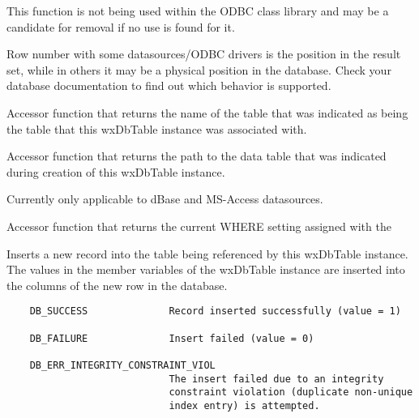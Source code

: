 This function is not being used within the ODBC class library and may be a
candidate for removal if no use is found for it.

Row number with some datasources/ODBC drivers is the position in the result set,
while in others it may be a physical position in the database.  Check your
database documentation to find out which behavior is supported.

\label{wxdbtablegettablename}


Accessor function that returns the name of the table that was indicated
as being the table that this wxDbTable instance was associated with.

\label{wxdbtablegettablepath}


Accessor function that returns the path to the data table that was indicated
during creation of this wxDbTable instance.


Currently only applicable to dBase and MS-Access datasources.

\label{wxdbtablegetwhereclause}


Accessor function that returns the current WHERE setting assigned with the



\label{wxdbtableinsert}


Inserts a new record into the table being referenced by this wxDbTable
instance.  The values in the member variables of the wxDbTable instance are
inserted into the columns of the new row in the database.


\begin{verbatim}
    DB_SUCCESS              Record inserted successfully (value = 1)

    DB_FAILURE              Insert failed (value = 0)

    DB_ERR_INTEGRITY_CONSTRAINT_VIOL
                            The insert failed due to an integrity
                            constraint violation (duplicate non-unique
                            index entry) is attempted.
\end{verbatim}

